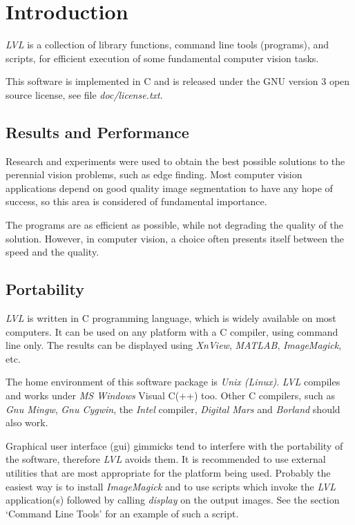 \documentclass[11pt,twoside,english,a4paper]{article}
\begin{document}
\section{Introduction}
\emph{LVL} is a collection of library functions, command line tools (programs), and scripts, for efficient execution of some fundamental computer vision tasks.

This software is implemented in C and is released under the GNU version 3 open source license, see file \emph{doc/license.txt}.

\subsection{Results and Performance}
Research and experiments were used to obtain the
best possible solutions to the perennial vision problems, such as edge finding. 
Most computer vision applications depend on good
quality image segmentation to have any hope of success, so this area
is considered of fundamental importance.

The programs are as efficient as possible, while not degrading
the quality of the solution. However, in computer vision, a choice 
often presents itself between the speed and the quality.

\subsection{Portability}
\emph{LVL} is written in C programming language, which is widely
available on most computers. It can be used on any platform
with a C compiler, using command line only. The results can 
be displayed using \emph{XnView}, \emph{MATLAB}, \emph{ImageMagick}, etc.

The home environment of this software package is \emph{Unix (Linux)}.
\emph{LVL} compiles and works under \emph{MS Windows} Visual C(++) too. 
Other C compilers, such as \emph{Gnu Mingw}, \emph{Gnu Cygwin}, the \emph{Intel} compiler,  \emph{Digital Mars}  and \emph{ Borland} should also work.

Graphical user interface (gui) gimmicks tend to interfere with the portability of the software, therefore \emph{LVL} avoids them. It is recommended to use external utilities that are most appropriate for the platform being used. Probably the easiest way is to install \emph{ImageMagick} and to use scripts which invoke the \emph{LVL} application(s) followed by calling \emph{display} on the output images. 
See the section `Command Line Tools' for an example of such a script.
\end{document}
